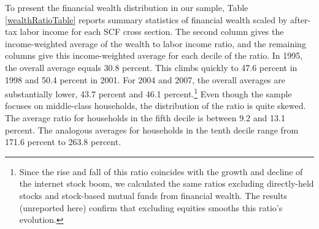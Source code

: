 \documentclass[fleqccn,12pt]{article}
\begin{document}
To present the financial wealth distribution in our sample, Table \ref{wealthRatioTable} reports summary statistics of financial wealth scaled by after-tax labor income for each SCF cross section. The second column gives the income-weighted average of the wealth to labor income ratio, and the remaining columns give this income-weighted average for each decile of the ratio. In 1995, the overall average equals 30.8 percent. This climbs quickly to 47.6 percent in 1998 and 50.4 percent in 2001. For 2004 and 2007, the overall averages are substantially lower, 43.7 percent and 46.1 percent.\footnote{Since the rise and fall of this ratio coincides with the growth and decline of the internet stock boom, we calculated the same ratios excluding directly-held stocks and stock-based mutual funds from financial wealth. The results (unreported here) confirm that excluding equities smooths this ratio's evolution.}  Even though the sample focuses on middle-class households, the distribution of the ratio is quite skewed. The average ratio for households in the fifth decile is between 9.2 and 13.1 percent. The analogous averages for households in the tenth decile range from 171.6 percent to 263.8 percent. 
\end{document}
